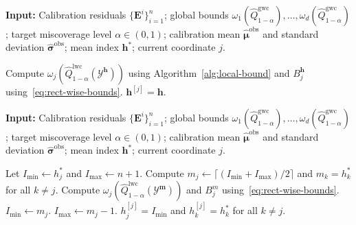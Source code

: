 \begin{algorithm}[!htbp]
\caption{Backward Search in Algorithm~\ref{alg:shortcut}}
\label{alg:backward}
\textbf{Input:} Calibration residuals $\{\mathbf{E}^i\}_{i=1}^{n}$; global bounds $\omega_1(\hat{Q}^{\mathrm{gwc}}_{1-\alpha}),\ldots,\omega_d(\hat{Q}^{\mathrm{gwc}}_{1-\alpha})$; target miscoverage level $\alpha\in(0,1)$; calibration mean $\hat{\boldsymbol\mu}^{\mathrm{obs}}$ and standard deviation $\hat{\boldsymbol\sigma}^{\mathrm{obs}}$; mean index $\mathbf{h}^*$; current coordinate $j$.
\begin{algorithmic}[1]
        \State Compute $\omega_j(\hat{Q}^{\mathrm{lwc}}_{1-\alpha}(\mathcal{Y}^{\mathbf{h}}))$ using Algorithm~\ref{alg:local-bound} and $B^{\mathbf{h}}_j$ using~\eqref{eq:rect-wise-bounds}.
            \State \Return $\mathbf{h}^{[j]} = \mathbf{h}$.
        \EndIf
    \EndFor
\end{algorithmic}
\end{algorithm}

\begin{algorithm}[!htb]
\caption{Binary Search in Algorithm~\ref{alg:shortcut}}
\label{alg:binary}
\textbf{Input:} Calibration residuals $\{\mathbf{E}^i\}_{i=1}^{n}$; global bounds $\omega_1(\hat{Q}^{\mathrm{gwc}}_{1-\alpha}),\ldots,\omega_d(\hat{Q}^{\mathrm{gwc}}_{1-\alpha})$; target miscoverage level $\alpha\in(0,1)$; calibration mean $\hat{\boldsymbol\mu}^{\mathrm{obs}}$ and standard deviation $\hat{\boldsymbol\sigma}^{\mathrm{obs}}$; mean index $\mathbf{h}^*$; current coordinate $j$.
\begin{algorithmic}[1]
    \State Let $I_{\min} \gets h^*_j$ and $I_{\max} \gets n+1$.
        \State Compute $m_j\gets \lceil (I_{\mathrm{min}}+I_\mathrm{max})/2\rceil$ and $m_k = h^*_k$ for all $k\neq j$.
        \State Compute $\omega_j(\hat{Q}^{\mathrm{lwc}}_{1-\alpha}(\mathcal{Y}^{\mathbf{m}}))$ and $B^{m}_j$ using~\eqref{eq:rect-wise-bounds}.\hfill
            \State $I_{\mathrm{min}} \gets m_j$.
        \Else 
            \State $I_{\mathrm{max}} \gets m_j-1$.
        \EndIf
            \State \Return $h^{[j]}_j = I_{\min}$ and $h^{[j]}_k = h^*_k$ for all $k\neq j$.
        \EndIf
    \EndWhile
\end{algorithmic}
\end{algorithm}


